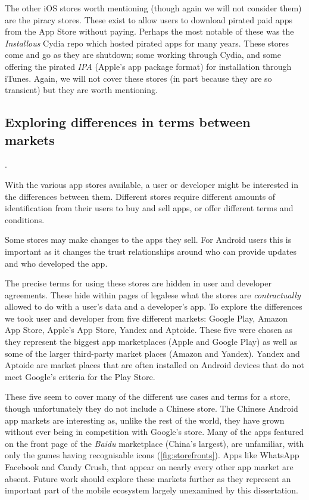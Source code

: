\documentclass[thesis.tex]{subfiles}
\begin{document}
The other iOS stores worth mentioning (though again we will not consider them) are the piracy stores.
These exist to allow users to download pirated paid apps from the App Store without paying.
Perhaps the most notable of these was the \emph{Installous} Cydia repo which hosted pirated apps for many years.
These stores come and go as they are shutdown; some working through Cydia, and some offering the pirated \emph{IPA} (Apple's app package format) for installation through iTunes.
Again, we will not cover these stores (in part because they are so transient) but they are worth mentioning.

\subsection{Exploring differences in terms between markets}.

With the various app stores available, a user or developer might be interested in the differences between them.
Different stores require different amounts of identification from their users to buy and sell apps, or offer different terms and conditions.

Some stores may make changes to the apps they sell.  For Android users this is important as it changes the trust relationships around who can provide updates and who developed the app.

The precise terms for using these stores are hidden in user and developer agreements.
These hide within pages of legalese what the stores are \emph{contractually} allowed to do with a user's data and a developer's app.
To explore the differences we took user and developer from five different markets: Google Play, Amazon App Store, Apple's App Store, Yandex and Aptoide.
These five were chosen as they represent the biggest app marketplaces (Apple and Google Play) as well as some of the larger third-party market places (Amazon and Yandex).
Yandex and Aptoide are market places that are often installed on Android devices that do not meet Google's criteria for the Play Store.

These five seem to cover many of the different use cases and terms for a store, though unfortunately they do not include a Chinese store.
The Chinese Android app markets are interesting as, unlike the rest of the world, they have grown without ever being in competition with Google's store.
Many of the apps featured on the front page of the \emph{Baidu} marketplace (China's largest), are unfamiliar, with only the games having recognisable icons (\autoref{fig:storefronts}).
Apps like WhatsApp Facebook and Candy Crush, that appear on nearly every other app market are absent.
Future work should explore these markets further as they represent an important part of the mobile ecosystem largely unexamined by this dissertation.
\end{document}
